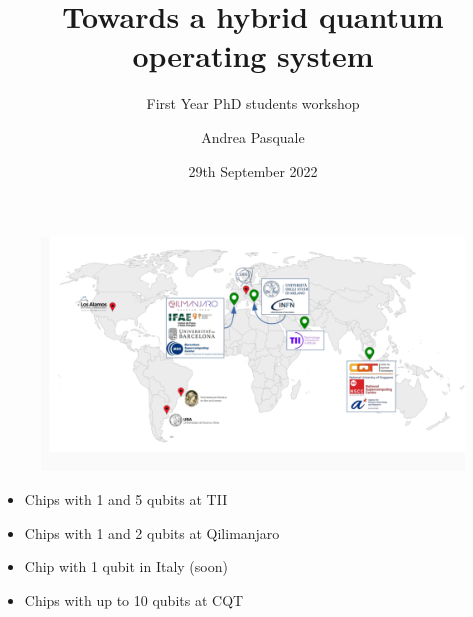 \documentclass[11pt]{beamer}
\title{Towards a hybrid quantum operating system}
\subtitle{First Year PhD students workshop}
\author{Andrea Pasquale}
\date{29th September 2022}
\begin{document}
\maketitle


\begin{frame}
    \begin{figure}
        \includegraphics[width=\textwidth]{figures/map.png}
    \end{figure}
        \begin{multicols}{2}
            \begin{itemize}
                \item Chips with 1 and 5 qubits at TII
                \item Chips with 1 and 2 qubits at Qilimanjaro
                \item Chip with 1 qubit in Italy (soon)
                \item Chips with up to 10 qubits at CQT
            \end{itemize}
        \end{multicols}
\end{frame}


    
\end{document}
